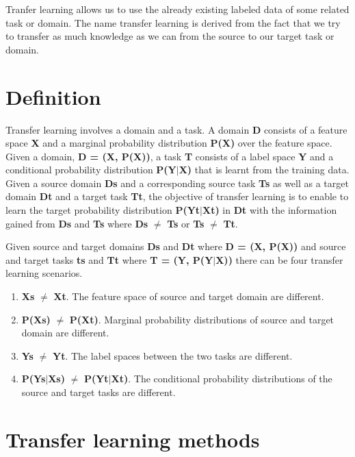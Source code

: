 \documentclass[a4paper, 12pt, oneside, BCOR1cm,toc=chapterentrywithdots]{scrbook}
\begin{document}
Tranfer learning allows us to use the already existing labeled data of some related task or domain. The name transfer learning is derived from the fact that we try to transfer as much knowledge as we can from the source to our target task or domain. 

\section{Definition}

Transfer learning involves a domain and a task. A domain \textbf{D} consists of a feature space \textbf{X} and a marginal probability distribution \textbf{P(X)} over the feature space. Given a domain, \textbf{D = (X, P(X))}, a task \textbf{T} consists of a label space \textbf{Y} and a conditional probability distribution \textbf{P(Y$\vert$X)} that is learnt from the training data. Given a source domain \textbf{Ds} and a corresponding source task \textbf{Ts} as well as a target domain \textbf{Dt} and a target task \textbf{Tt}, the objective of transfer learning is to enable to learn the target probability distribution \textbf{P(Yt$\vert$Xt)} in \textbf{Dt} with the information gained from \textbf{Ds} and \textbf{Ts} where  \textbf{Ds} $\neq$ \textbf{Ts} or \textbf{Ts} $\neq$ \textbf{Tt}. 

Given source and target domains \textbf{Ds} and \textbf{Dt} where \textbf{D = (X, P(X))} and source and target tasks \textbf{ts} and \textbf{Tt} where \textbf{T = (Y, P(Y$\vert$X))} there can be four transfer learning scenarios.

\begin{enumerate}
	\item \textbf{Xs} $\neq$ \textbf{Xt}. The feature space of source and target domain are different. 
	\item \textbf{P(Xs)} $\neq$ \textbf{P(Xt)}. Marginal probability distributions of source and target domain are different.
	\item \textbf{Ys} $\neq$ \textbf{Yt}. The label spaces between the two tasks are different.
	\item \textbf{P(Ys$\vert$Xs)} $\neq$ \textbf{P(Yt$\vert$Xt)}. The  conditional probability distributions of the source and target tasks are different.
\end{enumerate}

\section{Transfer learning methods}
\end{document}

